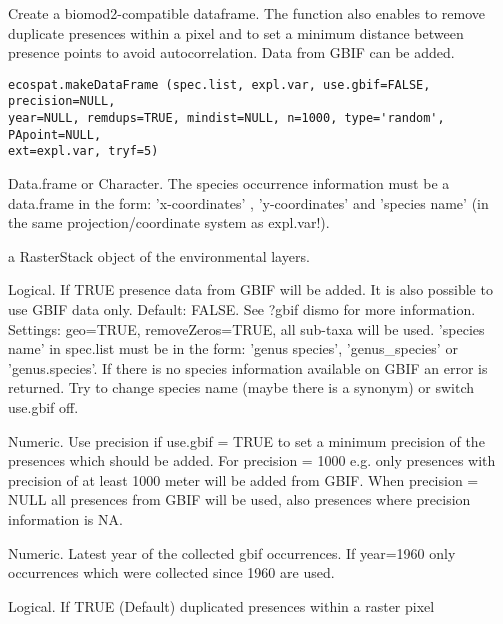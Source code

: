 \documentclass[a4paper]{book}
\begin{document}
%
\begin{Description}\relax
Create a biomod2-compatible dataframe. The function also enables to remove duplicate presences within a pixel and to set a minimum distance between presence points to avoid autocorrelation. Data from GBIF can be added.
\end{Description}
%
\begin{Usage}
\begin{verbatim}
ecospat.makeDataFrame (spec.list, expl.var, use.gbif=FALSE, precision=NULL,
year=NULL, remdups=TRUE, mindist=NULL, n=1000, type='random', PApoint=NULL,
ext=expl.var, tryf=5)
\end{verbatim}
\end{Usage}
%
\begin{Arguments}
\begin{ldescription}
\item[\code{spec.list}] Data.frame or Character. The species occurrence information must be a data.frame in the form:
\bsl{}'x-coordinates\bsl{}' , \bsl{}'y-coordinates\bsl{}' and \bsl{}'species name\bsl{}' (in the same projection/coordinate system as expl.var!).
\item[\code{expl.var}] a RasterStack object of the environmental layers.
\item[\code{use.gbif}] Logical. If TRUE presence data from GBIF will be added. It is also possible to use GBIF data only.
Default: FALSE. See ?gbif dismo for more information. Settings: geo=TRUE, removeZeros=TRUE,
all sub-taxa will be used.
\bsl{}'species name\bsl{}' in spec.list must be in the form: \bsl{}'genus species\bsl{}',
\bsl{}'genus\_species\bsl{}' or \bsl{}'genus.species\bsl{}'. If there is no species information available on GBIF an error is returned.
Try to change species name (maybe there is a synonym) or switch use.gbif off.
\item[\code{precision}] Numeric. Use precision if use.gbif = TRUE to set a minimum precision of
the presences which should be added. For precision = 1000
e.g. only presences with precision of at least 1000 meter will be added from GBIF.
When precision = NULL all presences from GBIF will be used, also presences
where precision information is NA.
\item[\code{year}] Numeric. Latest year of the collected gbif occurrences. If year=1960 only occurrences which were collected since 1960 are used.
\item[\code{remdups}] Logical. If TRUE (Default) duplicated presences within a raster pixel

\end{ldescription}
\end{Arguments}
\end{document}
